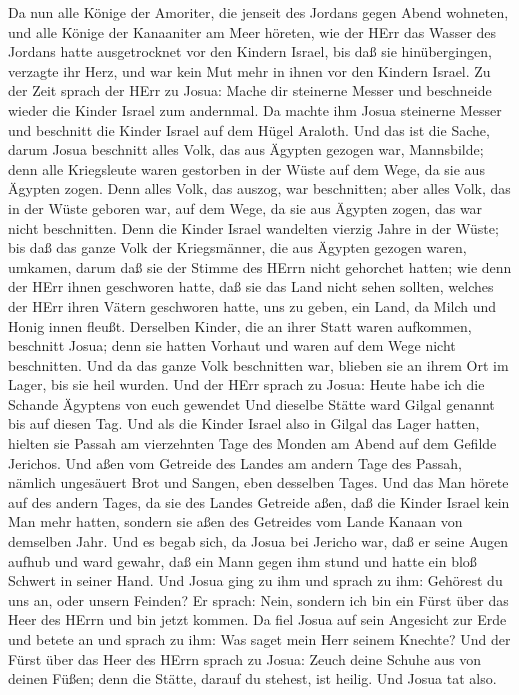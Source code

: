  Da nun alle Könige der Amoriter, die jenseit des Jordans
gegen Abend wohneten, und alle Könige der Kanaaniter am Meer höreten,
wie der HErr das Wasser des Jordans hatte ausgetrocknet vor den Kindern
Israel, bis daß sie hinübergingen, verzagte ihr Herz, und war kein Mut
mehr in ihnen vor den Kindern Israel.  Zu der Zeit sprach
der HErr zu Josua: Mache dir steinerne Messer und beschneide wieder die
Kinder Israel zum andernmal.  Da machte ihm Josua steinerne
Messer und beschnitt die Kinder Israel auf dem Hügel Araloth.
 Und das ist die Sache, darum Josua beschnitt alles Volk,
das aus Ägypten gezogen war, Mannsbilde; denn alle Kriegsleute waren
gestorben in der Wüste auf dem Wege, da sie aus Ägypten zogen.
 Denn alles Volk, das auszog, war beschnitten; aber alles
Volk, das in der Wüste geboren war, auf dem Wege, da sie aus Ägypten
zogen, das war nicht beschnitten.  Denn die Kinder Israel
wandelten vierzig Jahre in der Wüste; bis daß das ganze Volk der
Kriegsmänner, die aus Ägypten gezogen waren, umkamen, darum daß sie der
Stimme des HErrn nicht gehorchet hatten; wie denn der HErr ihnen
geschworen hatte, daß sie das Land nicht sehen sollten, welches der HErr
ihren Vätern geschworen hatte, uns zu geben, ein Land, da Milch und
Honig innen fleußt.  Derselben Kinder, die an ihrer Statt
waren aufkommen, beschnitt Josua; denn sie hatten Vorhaut und waren auf
dem Wege nicht beschnitten.  Und da das ganze Volk
beschnitten war, blieben sie an ihrem Ort im Lager, bis sie heil wurden.
 Und der HErr sprach zu Josua: Heute habe ich die Schande
Ägyptens von euch gewendet Und dieselbe Stätte ward Gilgal genannt bis
auf diesen Tag.  Und als die Kinder Israel also in Gilgal
das Lager hatten, hielten sie Passah am vierzehnten Tage des Monden am
Abend auf dem Gefilde Jerichos.  Und aßen vom Getreide des
Landes am andern Tage des Passah, nämlich ungesäuert Brot und Sangen,
eben desselben Tages.  Und das Man hörete auf des andern
Tages, da sie des Landes Getreide aßen, daß die Kinder Israel kein Man
mehr hatten, sondern sie aßen des Getreides vom Lande Kanaan von
demselben Jahr.  Und es begab sich, da Josua bei Jericho
war, daß er seine Augen aufhub und ward gewahr, daß ein Mann gegen ihm
stund und hatte ein bloß Schwert in seiner Hand. Und Josua ging zu ihm
und sprach zu ihm: Gehörest du uns an, oder unsern Feinden?
 Er sprach: Nein, sondern ich bin ein Fürst über das Heer
des HErrn und bin jetzt kommen. Da fiel Josua auf sein Angesicht zur
Erde und betete an und sprach zu ihm: Was saget mein Herr seinem
Knechte?  Und der Fürst über das Heer des HErrn sprach zu
Josua: Zeuch deine Schuhe aus von deinen Füßen; denn die Stätte, darauf
du stehest, ist heilig. Und Josua tat also.

